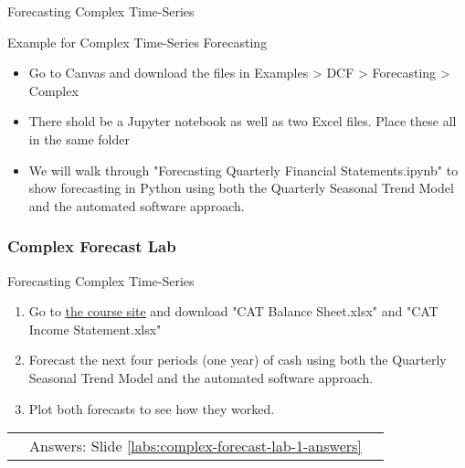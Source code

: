 \documentclass[handout, 11pt]{beamer}
\begin{document}
\begin{section}{Forecasting Complex Time-Series}
\begin{frame}
{\begin{block}{Example for Complex Time-Series Forecasting}
\begin{itemize}
\item Go to Canvas and download the files in Examples > DCF > Forecasting > Complex
\item There shold be a Jupyter notebook as well as two Excel files. Place these all in the same folder
\item We will walk through "Forecasting Quarterly Financial Statements.ipynb" to show forecasting in Python using both the Quarterly Seasonal Trend Model and the automated software approach.
\end{itemize}
\end{block}
}
\end{frame}
\begin{frame}
\frametitle{Complex Forecast Lab}
{
\begin{block}{Forecasting Complex Time-Series}
\begin{enumerate}
\item Go to
\textcolor{blue}{\underline{\href{https://nickderobertis.github.io/fin-model-course/}{the course site}}}
and download "CAT Balance Sheet.xlsx" and "CAT Income Statement.xlsx"
\item Forecast the next four periods (one year) of cash using both the Quarterly Seasonal Trend Model and the automated software approach.
\item Plot both forecasts to see how they worked.
\end{enumerate}
\vfill
\begin{tabular*}{\textwidth}{@{\extracolsep{\fill}}ccc}
\toprule
\hfill & Answers: Slide \textcolor{blue}{\underline{\ref{labs:complex-forecast-lab-1-answers}}} & \hfill\\

\end{tabular*}
\end{block}
}
\label{labs:complex-forecast-lab-1}
\end{frame}
\end{section}
\end{document}
